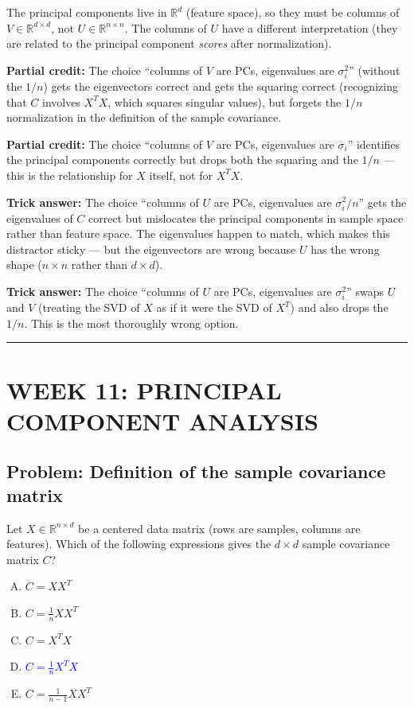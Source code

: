 \documentclass[12pt]{amsart}
\newcommand{\divider}{
  \vspace{-1em}
  \noindent
  \raisebox{-0.15ex}{\textbullet}%
  \hspace{0.5em}%
  \rule[0.5ex]{0.95\textwidth}{1.0pt}%
  \hspace{0.5em}%
  \raisebox{-0.15ex}{\textbullet}%
  \vspace{0em}
}
\begin{document}
The principal components live in $\mathbb{R}^d$ (feature space), so they
must be columns of $V \in \mathbb{R}^{d \times d}$, not $U \in \mathbb{R}^{n \times n}$.
The columns of $U$ have a different interpretation (they are related to
the principal component \emph{scores} after normalization).

\textbf{Partial credit:}
The choice ``columns of $V$ are PCs, eigenvalues are $\sigma_i^2$'' (without
the $1/n$) gets the eigenvectors correct and gets the squaring correct
(recognizing that $C$ involves $X^T X$, which squares singular values), but
forgets the $1/n$ normalization in the definition of the sample covariance.

\textbf{Partial credit:}
The choice ``columns of $V$ are PCs, eigenvalues are $\sigma_i$'' identifies
the principal components correctly but drops both the squaring and the
$1/n$ --- this is the relationship for $X$ itself, not for $X^T X$.

\textbf{Trick answer:}
The choice ``columns of $U$ are PCs, eigenvalues are $\sigma_i^2 / n$'' gets
the eigenvalues of $C$ correct but mislocates the principal components in
sample space rather than feature space. The eigenvalues happen to match,
which makes this distractor sticky --- but the eigenvectors are wrong
because $U$ has the wrong shape ($n \times n$ rather than $d \times d$).

\textbf{Trick answer:}
The choice ``columns of $U$ are PCs, eigenvalues are $\sigma_i^2$'' swaps
$U$ and $V$ (treating the SVD of $X$ as if it were the SVD of $X^T$) and
also drops the $1/n$. This is the most thoroughly wrong option.

\divider

\section*{WEEK 11: PRINCIPAL COMPONENT ANALYSIS}

\subsection*{Problem: Definition of the sample covariance matrix}

Let $X \in \mathbb{R}^{n \times d}$ be a centered data matrix (rows are
samples, columns are features). Which of the following expressions gives
the $d \times d$ sample covariance matrix $C$?

\begin{enumerate}[(A)]
    \item $C = X X^T$
    \item $C = \frac{1}{n} X X^T$
    \item $C = X^T X$
    \item \textcolor{blue}{\textbf{$C = \frac{1}{n} X^T X$}}
    \item $C = \frac{1}{n-1} X X^T$
\end{enumerate}
\end{document}
